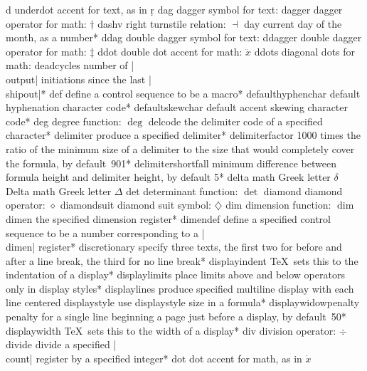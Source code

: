 \capcs d {underdot accent for text, as in \d r}{}{}
\capcs dag {dagger symbol for text: \dag}{}{}
\capcs dagger {dagger operator for math: $\dagger$}{}{}
\capcs dashv {right turnstile relation: $\dashv$}{}{}
\capcs day {current day of the month, as a number}*{}
\capcs ddag {double dagger symbol for text: \ddag}{}{}
\capcs ddagger {double dagger operator for math: $\ddagger$}{}{}
\capcs ddot  {double dot accent for math: $\ddot x$}{}{}
\capcs ddots {diagonal dots for math: \smash{$\ddots$}}{}{}
\capcs deadcycles {number of |\\output| initiations since the last
   |\\shipout|}*{}
\capcs def {define a control sequence to be a macro}*{}
\capcs defaulthyphenchar {default hyphenation character code}*{}
\capcs defaultskewchar {default accent skewing character code}*{}
\capcs deg {degree function: $\deg$}{}{}
\capcs delcode {the delimiter code of a specified character}*{}
\capcs delimiter {produce a specified delimiter}*{}
\capcs delimiterfactor {1000 times the ratio of the minimum size of a
   delimiter to the size that would completely cover the formula, by
   default~901}*{}
\capcs delimitershortfall {minimum difference between formula height and
   delimiter height, by default 5\pt}*{}
\capcs delta {math Greek letter $\delta$}{}{}
\capcs Delta {math Greek letter $\Delta$}{}{}
\capcs det {determinant function: $\det$}{}{}
\capcs diamond {diamond operator: $\diamond$}{}{}
\capcs diamondsuit {diamond suit symbol: $\diamondsuit$}{}{}
\capcs dim {dimension function: $\dim$}{}{}
\capcs dimen {the specified dimension register}*{}
\capcs dimendef {define a specified control sequence to be a number
   corresponding to a |\\dimen| register}*{}
\capcs discretionary {specify three texts, the first two for before and
   after a line break, the third for no line break}*{}
\capcs displayindent {\TeX\ sets this to the indentation of a display}*{}
\capcs displaylimits {place limits above and below operators only in display
   styles}*{}
\capcs displaylines {produce specified multiline display with each 
   line centered}{}{}
\capcs displaystyle {use displaystyle size in a formula}*{}
\capcs displaywidowpenalty {penalty for a single line beginning a page 
   just before a display, by default~50}*{}
\capcs displaywidth {\TeX\ sets this to the width of a display}*{}
\capcs div {division operator: $\div$}{}{}
\capcs divide {divide a specified |\\count| register by a specified integer}*{}
\capcs dot {dot accent for math, as in $\dot x$}{}{}
